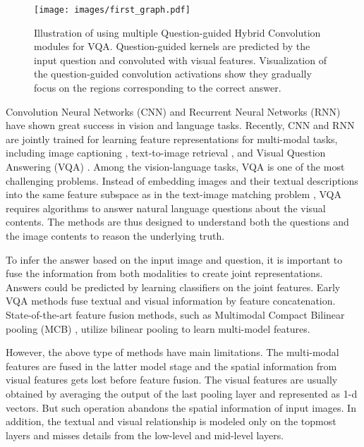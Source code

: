 \documentclass[runningheads]{llncs}
\begin{document}
\begin{figure}[t]
        \begin{center}
                \texttt{[image: images/first\_graph.pdf]}
        \end{center}
        \caption{Illustration of using multiple Question-guided Hybrid Convolution modules for VQA. Question-guided kernels are predicted by the input question and convoluted with visual features. Visualization of the question-guided convolution activations show they gradually focus on the regions corresponding to the correct answer.}
        \label{fig:QGC}
\end{figure}

Convolution Neural Networks (CNN) \cite{krizhevsky2012imagenet} and Recurrent Neural Networks (RNN) \cite{sutskever2014sequence} have shown great success in vision and language tasks. 
Recently, CNN and RNN are jointly trained for learning feature representations for multi-modal tasks, including image captioning \cite{li2017scene,xu2015show}, text-to-image retrieval \cite{hu2016natural,li2017person}, 
and Visual Question Answering (VQA) \cite{antol2015vqa,kim2016hadamard,ben2017mutan,lu2018rvqa}. 
Among the vision-language tasks, VQA is one of the most challenging problems. Instead of embedding images and their textual descriptions into the same feature subspace as in the text-image matching problem \cite{frome2013devise,reed2016learning,li2017identity}, VQA requires algorithms to answer natural language questions about the visual contents. The methods are thus designed to understand both the questions and the image contents to reason the underlying truth.

To infer the answer based on the input image and question, it is important to fuse the information from both modalities to create joint representations. Answers could be predicted by learning classifiers on the joint features. Early VQA methods \cite{zhou2015simple} fuse textual and visual information by feature concatenation. State-of-the-art feature fusion methods, such as Multimodal Compact Bilinear pooling (MCB) \cite{fukui2016multimodal}, utilize bilinear pooling to learn multi-model features.

However, the above type of methods have main limitations. The 
multi-modal features are fused in the latter model stage and the spatial information from visual features gets lost before feature fusion. 
The visual features are usually obtained by averaging the output of the last pooling layer and represented as 1-d vectors. But such operation abandons the spatial information of input images. 
In addition, the textual and visual relationship is modeled only on the topmost layers and misses details from the low-level and mid-level layers. 
\end{document}
